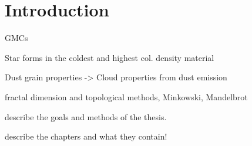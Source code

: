 \chapter{Introduction}

GMCs

Star forms in the coldest and highest col. density material

Dust grain properties -> Cloud properties from dust emission

fractal dimension and topological methods, Minkowski, Mandelbrot

describe the goals and methods of the thesis.

describe the chapters and what they contain!
